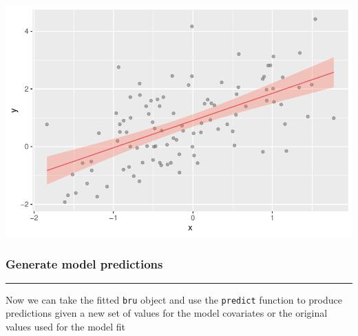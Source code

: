 \documentclass[
  letterpaper,
  DIV=11,
  numbers=noendperiod]{scrartcl}
\newenvironment{Shaded}{\begin{snugshade}}{\end{snugshade}}
\newcommand{\AttributeTok}[1]{\textcolor[rgb]{0.40,0.45,0.13}{#1}}
\newcommand{\ConstantTok}[1]{\textcolor[rgb]{0.56,0.35,0.01}{#1}}
\newcommand{\DecValTok}[1]{\textcolor[rgb]{0.68,0.00,0.00}{#1}}
\newcommand{\FunctionTok}[1]{\textcolor[rgb]{0.28,0.35,0.67}{#1}}
\newcommand{\NormalTok}[1]{\textcolor[rgb]{0.00,0.23,0.31}{#1}}
\newcommand{\OtherTok}[1]{\textcolor[rgb]{0.00,0.23,0.31}{#1}}
\newcommand{\SpecialCharTok}[1]{\textcolor[rgb]{0.37,0.37,0.37}{#1}}
\begin{document}
\begin{tcolorbox}
\begin{center}
\includegraphics{day1_practical_files/figure-pdf/unnamed-chunk-16-1.pdf}
\end{center}

\end{tcolorbox}

\subsubsection{Generate model
predictions}\label{generate-model-predictions}

\begin{center}\rule{0.5\linewidth}{0.5pt}\end{center}

Now we can take the fitted \texttt{bru} object and use the
\texttt{predict} function to produce predictions given a new set of
values for the model covariates or the original values used for the
model fit

\begin{Shaded}
\end{Shaded}
\end{document}
